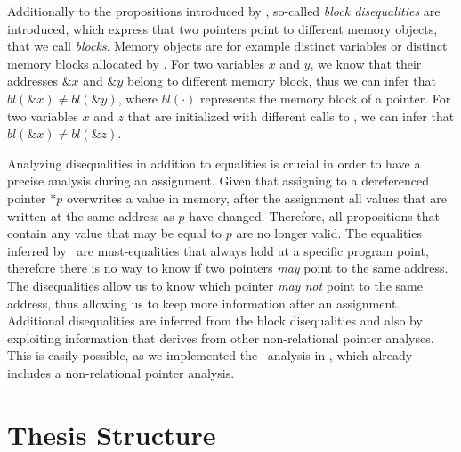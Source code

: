 Additionally to the propositions introduced by \textcite{2pointer}, so-called \emph{block disequalities}
are introduced, which express that two pointers point to different memory objects, that we call \emph{blocks}.
Memory objects are for example distinct variables or distinct memory blocks allocated by \malloc.
For two variables $x$ and $y$, we know that their addresses $\&x$ and $\&y$ belong to different memory block, thus we can infer that $bl(\&x) \neq bl(\&y)$, where $bl(\cdot)$ represents the memory block of a pointer.
For two variables $x$ and $z$ that are initialized with different calls to \malloc, we can infer that $bl(\&x) \neq bl(\&z)$.

Analyzing disequalities in addition to equalities is crucial in order to have a precise
analysis during an assignment.
Given that assigning to a dereferenced pointer $*p$ overwrites a value in memory, after the assignment
all values that are written at the same address as $p$ have changed.
Therefore, all propositions that contain any value that may be equal to $p$ are no longer valid.
The equalities inferred by \cpo\ are must-equalities that always hold at a specific program point,
therefore there is no way to know if two pointers \emph{may} point to the same address.
The disequalities allow us to know which pointer \emph{may not} point to the same address,
thus allowing us to keep more information after an assignment.
Additional disequalities are inferred from the block disequalities and also by
exploiting information that derives from other non-relational pointer analyses.
This is easily possible, as we implemented the \cpo\ analysis in \goblint, which already includes a non-relational pointer analysis.

\section{Thesis Structure}

